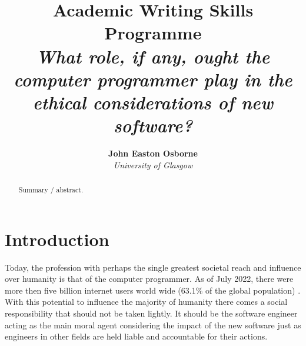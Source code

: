 \documentclass[11pt]{diazessay} %
\title{\textbf{Academic Writing Skills Programme} \\ {\Large\itshape What role, if any, ought the computer programmer play in the ethical considerations of new software?}} %
\author{\textbf{John Easton Osborne} \\ \textit{University of Glasgow}} %
\date{} %
\begin{document}
\maketitle %



\begin{abstract}
Summary / abstract.


\end{abstract}


\vspace{30pt} %


\section*{Introduction}

Today, the profession with perhaps the single greatest societal reach and influence over humanity is that of the computer programmer.
As of July 2022, there were more then five billion internet users world wide (63.1\% of the global population) \cite{statista:2022}.
With this potential to influence the majority of humanity there comes a social responsibility that should not be taken lightly.
It should be the software engineer acting as the main moral agent considering the impact of the new software just as engineers in other fields are held liable and accountable for their actions.
\end{document}
